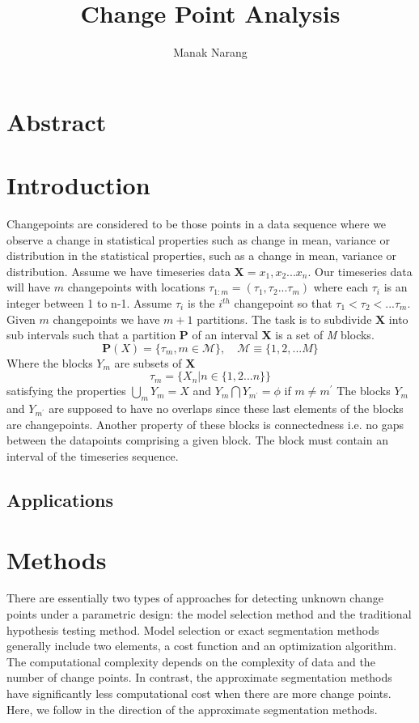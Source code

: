\documentclass{article}
\title{Change Point Analysis}
\author{Manak Narang}
\begin{document}
\maketitle
\tableofcontents
\section{Abstract}
\clearpage
\section{Introduction}
Changepoints are considered to be those points in a data sequence where we observe a change in statistical properties such as change in mean, variance or distribution in the statistical properties, such as a change in mean, variance or distribution. Assume we have timeseries data $\textbf{X} = x_{1},x_{2}...x_{n}$. Our timeseries data will have $m$ changepoints with locations $\tau_{1:m} = (\tau_{1},\tau_{2}...\tau_{m})$ where each $\tau_{i}$ is an integer between 1 to n-1. Assume $\tau_{i}$ is the $i^{th}$ changepoint so that $\tau_{1}<\tau_{2}<...\tau_{m}$. Given $m$ changepoints we have $m+1$ partitions. The task is to subdivide $\textbf{X}$ into sub intervals such that a partition \textbf{P} of an interval \textbf{X} is a set of \textit{M} blocks.
$$\textbf{P}(X) = \{\tau_{m},m\in\mathcal{M}\},\quad \mathcal{M} \equiv \{1,2,... M\}  $$
Where the blocks $Y_{m}$ are subsets of \textbf{X} $$ \tau_{m} = \{{X_{n}|n\in\{1,2...n\}}\}$$
satisfying the properties $\bigcup_{m} Y_{m} = X$ and $Y_{m} \bigcap Y_{m^{'}} = \phi$ if $m \neq m^{'}$
The blocks $Y_{m}$ and $Y_{m^{'}}$ are supposed to have no overlaps since these last elements of the blocks are changepoints. Another property of these blocks is connectedness i.e. no gaps between the datapoints comprising a given block. The block must contain an interval of the timeseries sequence. 
\subsection{Applications}
\cleardoublepage
\section{Methods}
There are essentially two types of approaches for detecting unknown change points under a parametric design: the model selection method and the traditional hypothesis testing method. Model selection or exact segmentation methods generally include two elements, a cost function and an optimization algorithm. The computational complexity depends on the complexity of data and the number of change points. 
In contrast, the approximate segmentation methods have significantly less computational cost when there are more change points. Here, we follow in the direction of the approximate segmentation methods.
\end{document}

